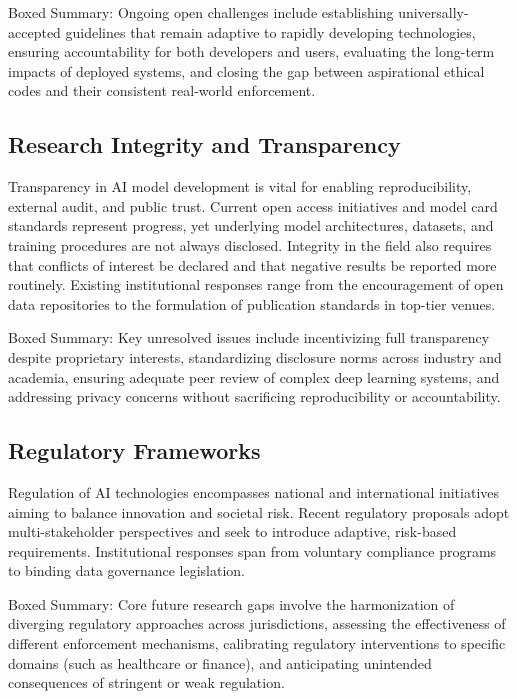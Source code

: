 \documentclass[sigconf]{acmart}
\begin{document}
Boxed Summary: Ongoing open challenges include establishing universally-accepted guidelines that remain adaptive to rapidly developing technologies, ensuring accountability for both developers and users, evaluating the long-term impacts of deployed systems, and closing the gap between aspirational ethical codes and their consistent real-world enforcement.

\subsection{Research Integrity and Transparency}

Transparency in AI model development is vital for enabling reproducibility, external audit, and public trust. Current open access initiatives and model card standards represent progress, yet underlying model architectures, datasets, and training procedures are not always disclosed. Integrity in the field also requires that conflicts of interest be declared and that negative results be reported more routinely. Existing institutional responses range from the encouragement of open data repositories to the formulation of publication standards in top-tier venues.

Boxed Summary: Key unresolved issues include incentivizing full transparency despite proprietary interests, standardizing disclosure norms across industry and academia, ensuring adequate peer review of complex deep learning systems, and addressing privacy concerns without sacrificing reproducibility or accountability.

\subsection{Regulatory Frameworks}

Regulation of AI technologies encompasses national and international initiatives aiming to balance innovation and societal risk. Recent regulatory proposals adopt multi-stakeholder perspectives and seek to introduce adaptive, risk-based requirements. Institutional responses span from voluntary compliance programs to binding data governance legislation.

Boxed Summary: Core future research gaps involve the harmonization of diverging regulatory approaches across jurisdictions, assessing the effectiveness of different enforcement mechanisms, calibrating regulatory interventions to specific domains (such as healthcare or finance), and anticipating unintended consequences of stringent or weak regulation.
\end{document}
